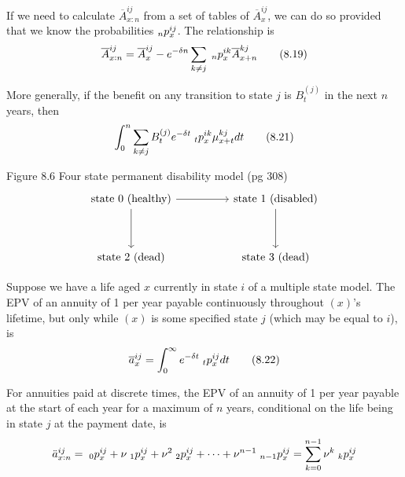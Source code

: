 \documentclass[hidelinks, 12pt]{article}
\theoremstyle{mydefstyle}
\theoremstyle{mythmstyle}
\begin{document}
If we need to calculate $\overline{A}_{x:n}^{ij}$ from a set of tables of $\overline{A}_x^{ij}$, we can do so provided that we know the probabilities $\hspace{0mm}_np_x^{ij}$. The relationship is
\begin{gather*}
\overline{A}_{x:n}^{ij} = \overline{A}_x^{ij} - e^{-\delta n} \sum_{k \ne j} \hspace{1mm}_np_x^{ik} \overline{A}_{x+n}^{kj} \tag{8.19}
\end{gather*}

More generally, if the benefit on any transition to state $j$ is $B_t^{(j)}$ in the next $n$ years, then
\begin{gather*}
\int_0^n \sum_{k \ne j} B_t^{(j)} e^{-\delta t} \hspace{1mm}_tp_x^{ik} \mu_{x+t}^{kj} dt \tag{8.21}
\end{gather*}

Figure 8.6 Four state permanent disability model (pg 308)
\[\begin{tikzcd}
\mbox{state 0 (healthy)} \arrow{rr} \arrow{dd} && \mbox{state 1 (disabled)} \arrow{dd} \\ \\
\mbox{state 2 (dead)} && \mbox{state 3 (dead)}
\end{tikzcd}\]

Suppose we have a life aged $x$ currently in state $i$ of a multiple state model. The EPV of an annuity of 1 per year payable continuously throughout $(x)$'s lifetime, but only while $(x)$ is some specified state $j$ (which may be equal to $i$), is
\begin{gather*}
\overline{a}_x^{ij} = \int_0^{\infty} e^{-\delta t} \hspace{1mm}_tp_x^{ij} dt \tag{8.22}
\end{gather*}

For annuities paid at discrete times, the EPV of an annuity of 1 per year payable at the start of each year for a maximum of $n$ years, conditional on the life being in state $j$ at the payment date, is
\begin{gather*}
\ddot{a}_{x:n}^{ij} = \hspace{1mm}_0p_x^{ij} + \nu \hspace{1mm}_1p_x^{ij} + \nu^2 \hspace{1mm}_2p_x^{ij} + \dots
+ \nu^{n-1} \hspace{1mm}_{n-1}p_x^{ij} = \sum_{k = 0}^{n-1} \nu^k \hspace{1mm}_kp_x^{ij}
\end{gather*}
\end{document}
